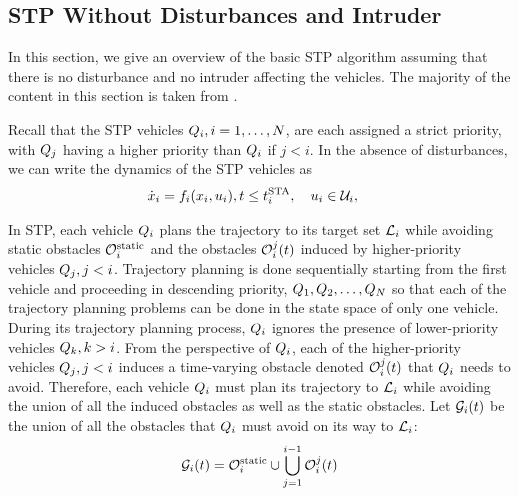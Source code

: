 \subsection{STP Without Disturbances and Intruder\label{sec:basic}}
In this section, we give an overview of the basic STP algorithm assuming that there is no disturbance and no intruder affecting the vehicles. 
The majority of the content in this section is taken from \cite{Chen15c}.

Recall that the STP vehicles $Q_i, i=1,\ldots,N$, are each assigned a strict priority, with $Q_j$ having a higher priority than $Q_i$ if $j<i$. In the absence of disturbances, we can write the dynamics of the STP vehicles as
\begin{equation}
\label{eq:dyn_no_dstb}
\begin{aligned}
\dot\state_i = \fdyn_i(\state_i, \ctrl_i), t \le \sta_i,\quad \ctrl_i &\in \cset_i, 
\end{aligned}
\end{equation}

In STP, each vehicle $Q_i$ plans the trajectory to its target set $\mathcal{L}_i$ while avoiding static obstacles $\mathcal{O}^\text{static}_i$ and the obstacles $\mathcal{O}_i^j(t)$ induced by higher-priority vehicles $Q_j, j<i$. Trajectory planning is done sequentially starting from the first vehicle and proceeding in descending priority, $Q_1, Q_2, \ldots, Q_{N}$ so that each of the trajectory planning problems can be done in the state space of only one vehicle. During its trajectory planning process, $Q_i$ ignores the presence of lower-priority vehicles $Q_k, k>i$.
From the perspective of $Q_i$, each of the higher-priority vehicles $Q_j, j<i$ induces a time-varying obstacle denoted $\mathcal{O}_i^j(t)$ that $Q_i$ needs to avoid. Therefore, each vehicle $Q_i$ must plan its trajectory to $\mathcal{L}_i$ while avoiding the union of all the induced obstacles as well as the static obstacles. Let $\mathcal{G}_i(t)$ be the union of all the obstacles that $Q_i$ must avoid on its way to $\mathcal{L}_i$:
\begin{equation}
\label{eq:obsseti}
\obsset_i(t)  = \soset_i \cup \bigcup_{j=1}^{i-1} \ioset_i^j(t)
\end{equation}

